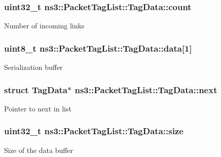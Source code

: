 \subsubsection[{\texorpdfstring{count}{count}}]{\setlength{\rightskip}{0pt plus 5cm}uint32\+\_\+t ns3\+::\+Packet\+Tag\+List\+::\+Tag\+Data\+::count}\hypertarget{structns3_1_1PacketTagList_1_1TagData_a877d4257ceb116e1231c3d7e33131c98}{}\label{structns3_1_1PacketTagList_1_1TagData_a877d4257ceb116e1231c3d7e33131c98}
Number of incoming links 
\subsubsection[{\texorpdfstring{data}{data}}]{\setlength{\rightskip}{0pt plus 5cm}uint8\+\_\+t ns3\+::\+Packet\+Tag\+List\+::\+Tag\+Data\+::data\mbox{[}1\mbox{]}}\hypertarget{structns3_1_1PacketTagList_1_1TagData_adb4e85fe6e4a21a95c184b55ef9a8ff4}{}\label{structns3_1_1PacketTagList_1_1TagData_adb4e85fe6e4a21a95c184b55ef9a8ff4}
Serialization buffer 
\subsubsection[{\texorpdfstring{next}{next}}]{\setlength{\rightskip}{0pt plus 5cm}struct {\bf Tag\+Data}$\ast$ ns3\+::\+Packet\+Tag\+List\+::\+Tag\+Data\+::next}\hypertarget{structns3_1_1PacketTagList_1_1TagData_a9c4f438b752b46cdd695a68fca886822}{}\label{structns3_1_1PacketTagList_1_1TagData_a9c4f438b752b46cdd695a68fca886822}
Pointer to next in list 
\subsubsection[{\texorpdfstring{size}{size}}]{\setlength{\rightskip}{0pt plus 5cm}uint32\+\_\+t ns3\+::\+Packet\+Tag\+List\+::\+Tag\+Data\+::size}\hypertarget{structns3_1_1PacketTagList_1_1TagData_a6d4ea1a09db8032900e037cfe938866f}{}\label{structns3_1_1PacketTagList_1_1TagData_a6d4ea1a09db8032900e037cfe938866f}
Size of the {\ttfamily data} buffer 
